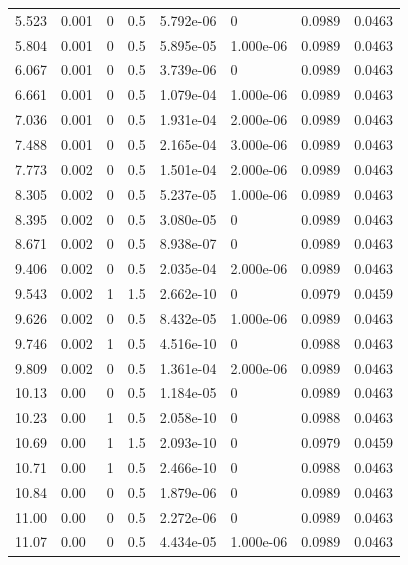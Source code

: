 \documentclass[preview]{standalone}
\begin{document}
{{\begin{tabular}{L{1.2cm}C{1.2cm} C{0.3cm}C{0.5cm} C{1.4cm}C{1.4cm} C{1.4cm}C{1.4cm}}
  5.523  &  0.001  & 0     & 0.5 &  5.792e-06  & 0  & 0.0989 &  0.0463   \\ 
  5.804  &  0.001  & 0     & 0.5 &  5.895e-05  & 1.000e-06  & 0.0989 &  0.0463   \\ 
  6.067  &  0.001  & 0     & 0.5 &  3.739e-06  & 0  & 0.0989 &  0.0463   \\ 
  6.661  &  0.001  & 0     & 0.5 &  1.079e-04  & 1.000e-06  & 0.0989 &  0.0463   \\ 
  7.036  &  0.001  & 0     & 0.5 &  1.931e-04  & 2.000e-06  & 0.0989 &  0.0463   \\ 
  7.488  &  0.001  & 0     & 0.5 &  2.165e-04  & 3.000e-06  & 0.0989 &  0.0463   \\ 
  7.773  &  0.002  & 0     & 0.5 &  1.501e-04  & 2.000e-06  & 0.0989 &  0.0463   \\ 
  8.305  &  0.002  & 0     & 0.5 &  5.237e-05  & 1.000e-06  & 0.0989 &  0.0463   \\ 
  8.395  &  0.002  & 0     & 0.5 &  3.080e-05  & 0  & 0.0989 &  0.0463   \\ 
  8.671  &  0.002  & 0     & 0.5 &  8.938e-07  & 0  & 0.0989 &  0.0463   \\ 
  9.406  &  0.002  & 0     & 0.5 &  2.035e-04  & 2.000e-06  & 0.0989 &  0.0463   \\ 
  9.543  &  0.002  & 1     & 1.5 &  2.662e-10  & 0  & 0.0979 &  0.0459   \\ 
  9.626  &  0.002  & 0     & 0.5 &  8.432e-05  & 1.000e-06  & 0.0989 &  0.0463   \\ 
  9.746  &  0.002  & 1     & 0.5 &  4.516e-10  & 0  & 0.0988 &  0.0463   \\ 
  9.809  &  0.002  & 0     & 0.5 &  1.361e-04  & 2.000e-06  & 0.0989 &  0.0463   \\ 
  10.13  &  0.00  & 0     & 0.5 &  1.184e-05  & 0  & 0.0989 &  0.0463   \\ 
  10.23  &  0.00  & 1     & 0.5 &  2.058e-10  & 0  & 0.0988 &  0.0463   \\ 
  10.69  &  0.00  & 1     & 1.5 &  2.093e-10  & 0  & 0.0979 &  0.0459   \\ 
  10.71  &  0.00  & 1     & 0.5 &  2.466e-10  & 0  & 0.0988 &  0.0463   \\ 
  10.84  &  0.00  & 0     & 0.5 &  1.879e-06  & 0  & 0.0989 &  0.0463   \\ 
  11.00  &  0.00  & 0     & 0.5 &  2.272e-06  & 0  & 0.0989 &  0.0463   \\ 
  11.07  &  0.00  & 0     & 0.5 &  4.434e-05  & 1.000e-06  & 0.0989 &  0.0463   \\ 

\end{tabular}}}
\end{document}
